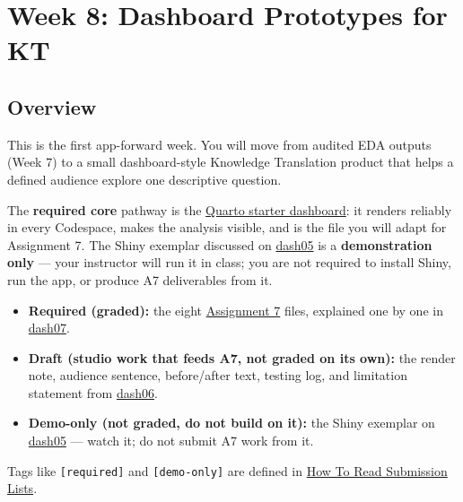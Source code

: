 \documentclass[
  letterpaper,
  DIV=11,
  numbers=noendperiod,
  oneside]{scrreprt}
\providecommand{\tightlist}{%
  \setlength{\itemsep}{0pt}\setlength{\parskip}{0pt}}
\begin{document}
\chapter*{Week 8: Dashboard Prototypes for
KT}\label{week-8-dashboard-prototypes-for-kt-1}


\section*{Overview}\label{overview-7}


This is the first app-forward week. You will move from audited EDA
outputs (Week 7) to a small dashboard-style Knowledge Translation
product that helps a defined audience explore one descriptive question.

The \textbf{required core} pathway is the
\href{dash03-starter-dashboard.qmd}{Quarto starter dashboard}: it
renders reliably in every Codespace, makes the analysis visible, and is
the file you will adapt for Assignment 7. The Shiny exemplar discussed
on \href{dash05-testing-privacy-and-shiny-demo.qmd}{dash05} is a
\textbf{demonstration only} --- your instructor will run it in class;
you are not required to install Shiny, run the app, or produce A7
deliverables from it.

\begin{tcolorbox}[enhanced jigsaw, title=\textcolor{quarto-callout-important-color}{\faExclamation}\hspace{0.5em}{Required / Draft / Optional This Week}, arc=.35mm, toptitle=1mm, colframe=quarto-callout-important-color-frame, toprule=.15mm, leftrule=.75mm, bottomtitle=1mm, opacityback=0, bottomrule=.15mm, coltitle=black, breakable, opacitybacktitle=0.6, titlerule=0mm, colback=white, left=2mm, colbacktitle=quarto-callout-important-color!10!white, rightrule=.15mm]

\begin{itemize}
\tightlist
\item
  \textbf{Required (graded):} the eight
  \href{../../assignments/assignment07-dashboard/README.md}{Assignment
  7} files, explained one by one in
  \href{dash07-assignment-a7-and-reference.qmd}{dash07}.
\item
  \textbf{Draft (studio work that feeds A7, not graded on its own):} the
  render note, audience sentence, before/after text, testing log, and
  limitation statement from
  \href{dash06-studio-dashboard-adaptation.qmd}{dash06}.
\item
  \textbf{Demo-only (not graded, do not build on it):} the Shiny
  exemplar on \href{dash05-testing-privacy-and-shiny-demo.qmd}{dash05}
  --- watch it; do not submit A7 work from it.
\end{itemize}

Tags like \texttt{{[}required{]}} and \texttt{{[}demo-only{]}} are
defined in \hyperref[how-to-read-submission-lists]{How To Read
Submission Lists}.

\end{tcolorbox}
\end{document}
